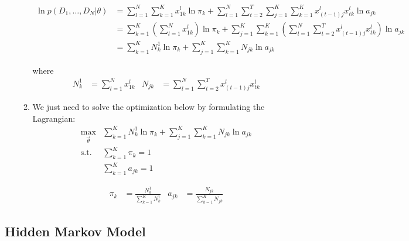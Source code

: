 \documentclass[12pt,twoside]{article}
\begin{document}
\begin{enumerate}
\begin{enumerate}
					\begin{align*}
						\ln p(D_1,\ldots, D_N\vert \theta) 
						& =\sum_{l=1}^N\sum_{k=1}^K x_{1k}^l\ln\pi_k +\sum_{l=1}^N\sum_{t=2}^T\sum_{j=1}^K \sum_{k=1}^K x^l_{(t-1)j}x^l_{tk}\ln a_{jk}\\
						& = \sum_{k=1}^K \left(\sum_{l=1}^N x_{1k}^l\right)\ln\pi_k +\sum_{j=1}^K \sum_{k=1}^K\left(\sum_{l=1}^N\sum_{t=2}^T x^l_{(t-1)j}x^l_{tk}\right)\ln a_{jk}\\
						& = \sum_{k=1}^K N_k^1 \ln \pi_k + \sum_{j=1}^K \sum_{k=1}^K N_{jk} \ln a_{jk}
					\end{align*}
					
					where 
					\begin{align*}
						N_k^1& = \sum_{l=1}^N x_{1k}^l & N_{jk}&=\sum_{l=1}^N\sum_{t=2}^T x^l_{(t-1)j}x^l_{tk}
					\end{align*}

				\item We just need to solve the optimization below by formulating the Lagrangian:
					\begin{align*}
						\max_{\vec{\theta}}	&\sum_{k=1}^K N_k^1 \ln \pi_k + \sum_{j=1}^K \sum_{k=1}^K N_{jk} \ln a_{jk}\\
						\text{s.t. }&	\sum_{k=1}^K \pi_k =1\\
										&	\sum_{k=1}^K a_{jk} = 1
					\end{align*}									
					
					\begin{align*}
						\pi_k &= \frac{N_k^1}{\sum_{k=1}^K N_k^1}	&	a_{jk} & =\frac{N_{jk}}{\sum_{k=1}^K N_{jk}}
					\end{align*}
				
			\end{enumerate}					
				
\end{enumerate}


\subsection{Hidden Markov Model}
\end{document}
